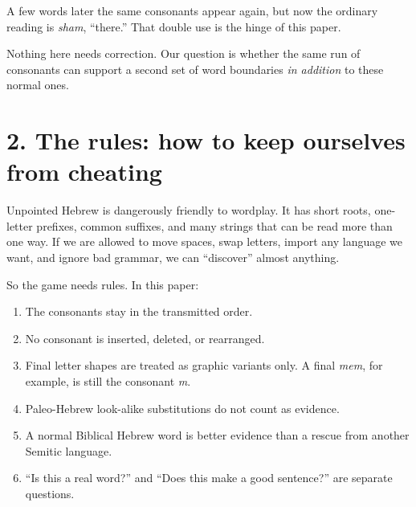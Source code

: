 A few words later the same consonants  appear again, but now the ordinary reading is \textit{sham}, ``there.'' That double use is the hinge of this paper.


Nothing here needs correction. Our question is whether the same run of consonants can support a second set of word boundaries \emph{in addition} to these normal ones.

\section*{2. The rules: how to keep ourselves from cheating}

Unpointed Hebrew is dangerously friendly to wordplay. It has short roots, one-letter prefixes, common suffixes, and many strings that can be read more than one way. If we are allowed to move spaces, swap letters, import any language we want, and ignore bad grammar, we can ``discover'' almost anything.

So the game needs rules. In this paper:

\begin{enumerate}
\item The consonants stay in the transmitted order.
\item No consonant is inserted, deleted, or rearranged.
\item Final letter shapes are treated as graphic variants only. A final \textit{mem}, for example, is still the consonant \textit{m}.
\item Paleo-Hebrew look-alike substitutions do not count as evidence.
\item A normal Biblical Hebrew word is better evidence than a rescue from another Semitic language.
\item ``Is this a real word?'' and ``Does this make a good sentence?'' are separate questions.
\end{enumerate}

